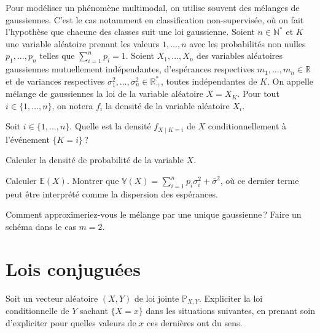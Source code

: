 Pour modéliser un phénomène multimodal, on utilise souvent des mélanges
de gaussiennes. C'est le cas notamment en classification non-supervisée,
où on fait l'hypothèse que chacune des classes suit une loi gaussienne.
Soient \(n\in\mathbb{N}^\ast\) et \(K\) une variable aléatoire prenant
les valeurs \(1,\dots,n\) avec les probabilités non nulles
\(p_1,\dots,p_n\) telles que \(\sum_{i = 1}^n p_i = 1\). Soient
\(X_1,\dots,X_n\) des variables aléatoires gaussiennes mutuellement
indépendantes, d'espérances respectives \(m_1,\dots,m_n \in \mathbb{R}\)
et de variances respectives
\(\sigma_1^2,\dots,\sigma_n^2 \in\mathbb{R}_+^\ast\), toutes
indépendantes de \(K\). On appelle mélange de gaussiennes la loi de la
variable aléatoire \(X = X_K\). Pour tout \(i\in\{1,\dots,n\}\), on
notera \(f_i\) la densité de la variable aléatoire \(X_i\).

\label{III-melloi1}
Soit \(i \in \{1,\dots,n\}\). Quelle est la densité \(f_{X\mid K = i}\)
de \(X\) conditionnellement à l'événement
\(\{K = i\}\)\,?

\label{III-melloi2}
Calculer la densité de probabilité de la variable
\(X\).

\label{III-melloi3}
Calculer \(\mathbb{E}(X)\). Montrer que
\(\mathbb{V}(X) = \sum_{i = 1}^n p_i\sigma_i^2 + \bar{\sigma}^2\), où ce
dernier terme peut être interprété comme la dispersion des
espérances.

\label{III-melloi4}
Comment approximeriez-vous le mélange par une unique gaussienne\,? Faire
un schéma dans le cas \(m = 2\).

\section{Lois conjuguées}\label{III-lois-conjuguuxe9es}

Soit un vecteur aléatoire \((X,Y)\) de loi jointe \(\mathbb{P}_{X,Y}\).
Expliciter la loi conditionnelle de \(Y\) sachant \(\{X=x\}\) dans les
situations suivantes, en prenant soin d'expliciter pour quelles valeurs
de \(x\) ces dernières ont du sens.

